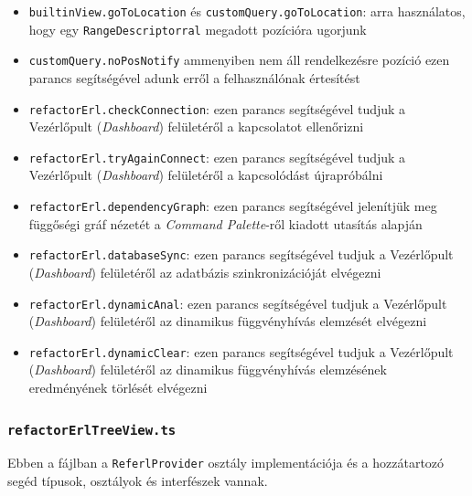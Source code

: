 \begin{itemize}
    \item \lstinline{builtinView.goToLocation} és \lstinline{customQuery.goToLocation}: arra használatos, hogy egy \lstinline{RangeDescriptorral} megadott pozícióra ugorjunk
    
    \item \lstinline{customQuery.noPosNotify} ammenyiben nem áll rendelkezésre pozíció ezen parancs segítségével adunk erről a felhasználónak értesítést
    
    \item \lstinline{refactorErl.checkConnection}: ezen parancs segítségével tudjuk a Vezérlőpult (\textit{Dashboard}) felületéről a kapcsolatot ellenőrizni
    
    \item \lstinline{refactorErl.tryAgainConnect}: ezen parancs segítségével tudjuk a Vezérlőpult (\textit{Dashboard}) felületéről a kapcsolódást újrapróbálni
    
    \item \lstinline{refactorErl.dependencyGraph}: ezen parancs segítségével jelenítjük meg függőségi gráf nézetét a \textit{Command Palette}-ről kiadott utasítás alapján
    
    \item \lstinline{refactorErl.databaseSync}:  ezen parancs segítségével tudjuk a Vezérlőpult (\textit{Dashboard}) felületéről az adatbázis szinkronizációját elvégezni
    
    
    \item \lstinline{refactorErl.dynamicAnal}: ezen parancs segítségével tudjuk a Vezérlőpult (\textit{Dashboard}) felületéről az dinamikus függvényhívás elemzését elvégezni
    
    \item \lstinline{refactorErl.dynamicClear}: ezen parancs segítségével tudjuk a Vezérlőpult (\textit{Dashboard}) felületéről az dinamikus függvényhívás elemzésének eredményének törlését elvégezni
    
\end{itemize}

\newpage

\subsubsection{\lstinline{refactorErlTreeView.ts}}

Ebben a fájlban a \lstinline{ReferlProvider} osztály implementációja és a hozzátartozó segéd típusok, osztályok és interfészek vannak.


